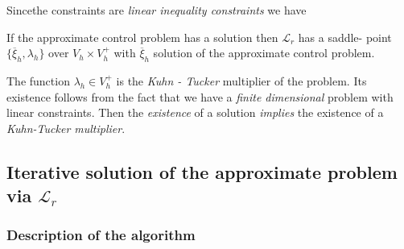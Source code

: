  Since\pageoriginale  the constraints are \textit{linear inequality constraints} we 
 have  
 
 \begin{proposition}\label{c6:prop6.1}%
If the approximate control problem has a solution then $\mathscr{L}_r$ 
has a saddle- point $\{\overline{\xi}_h, \lambda_h\}$ over $V_h \times 
V^+_h$ with $\overline{\xi}_h$ solution of the approximate control problem.    
 \end{proposition} 
 
 \begin{remark}\label{c6:rem6.1}%
The function $\lambda_h \in V^+_h$ is the {\em Kuhn - Tucker} 
multiplier of the problem. Its existence follows from the fact that we 
have a \textit{finite dimensional} problem with linear constraints. 
Then the \textit{existence} of a solution \textit{implies} the 
existence of a \textit{Kuhn-Tucker multiplier}.    
 \end{remark} 
 
 \subsection{Iterative solution of the approximate problem via 
 $\mathscr{L}_r$}\label{c6:ss6.3}%
 
 \subsubsection{Description of the algorithm}\label{c6:sss6.3.1}
 
